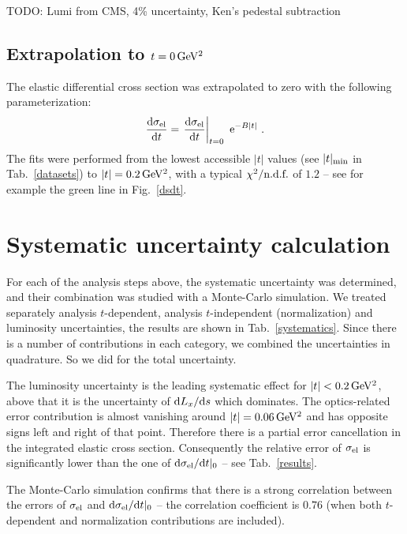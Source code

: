 \documentclass[doublecol]{../macros/epl2}
\def\d{{\rm d}}
\def\un#1{\,{\rm #1}}
\def\e{{\rm e}}
\begin{document}
TODO: Lumi from CMS, 4\% uncertainty, Ken's pedestal subtraction

\subsection{Extrapolation to $t=0\,\rm GeV^2$}

The elastic differential cross section was extrapolated to zero with the following parameterization:
\begin{equation}
\label{extrapolation}
{\d\sigma_{\rm el}\over \d t} = \left. {\d\sigma_{\rm el}\over \d t}\right|_{t=0} \ \e^{-B|t|}\ .
\end{equation}
The fits were performed from the lowest accessible $|t|$ values (see $|t|_{\rm min}$ in Tab.~\ref{datasets}) to $|t| = 0.2\un{GeV^2}$, with a typical $\chi^2/\hbox{n.d.f.}$ of $1.2$ -- see for example the green line in Fig.~\ref{dsdt}.

\section{Systematic uncertainty calculation}


For each of the analysis steps above, the systematic uncertainty was determined, and their combination was studied with a Monte-Carlo simulation. We treated separately analysis $t$-dependent, analysis $t$-independent (normalization) and luminosity uncertainties, the results are shown in Tab.~\ref{systematics}. Since there is a number of contributions in each category, we combined the uncertainties in quadrature. So we did for the total uncertainty.

The luminosity uncertainty is the leading systematic effect for $|t| < 0.2\un{GeV^2}$, above that it is the uncertainty of $\d L_x/\d s$ which dominates. The optics-related error contribution is almost vanishing around $|t| = 0.06\un{GeV^2}$ and has opposite signs left and right of that point. Therefore there is a partial error cancellation in the integrated elastic cross section. Consequently the relative error of $\sigma_{\rm el}$ is significantly lower than the one of $\d\sigma_{\rm el}/\d t|_0$ -- see Tab.~\ref{results}.

The Monte-Carlo simulation confirms that there is a strong correlation between the errors of $\sigma_{\rm el}$ and $\d\sigma_{\rm el}/\d t|_0$ -- the correlation coefficient is $0.76$ (when both $t$-dependent and normalization contributions are included).
\end{document}

